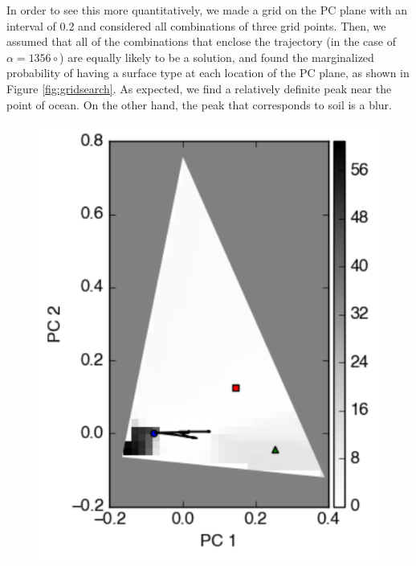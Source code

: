 \documentclass[iop,numberedappendix,apj,]{emulateapj}
\begin{document}
In order to see this more quantitatively, we made a grid on the PC plane  with an interval of 0.2 and considered all combinations of three grid points. 
Then, we assumed that all of the combinations that enclose the trajectory (in the case of $\alpha = 1356{\circ }$) are equally likely to be a solution, and found the marginalized probability of having a surface type at each location of the PC plane, as shown in Figure \ref{fig:gridsearch}. 
%
As expected, we find a relatively definite peak near the point of ocean. 
On the other hand, the peak that corresponds to soil is a blur. 

\begin{figure}[tbh!]
    \begin{center}
\includegraphics[width=\hsize]{mockdata_90deg_3types_t12_lc_noreg.pdf}
    \end{center}
    \caption{}
\label{fig:noreg}
\end{figure}
\end{document}
